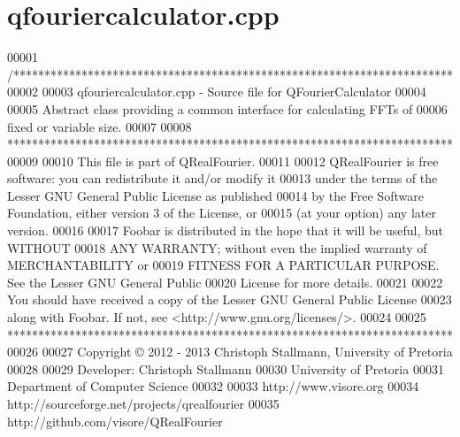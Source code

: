 \hypertarget{a00117_source}{\section{qfouriercalculator.\+cpp}
\label{a00117_source}
}

\begin{DoxyCode}
00001 \textcolor{comment}{/***********************************************************************}
00002 \textcolor{comment}{}
00003 \textcolor{comment}{qfouriercalculator.cpp - Source file for QFourierCalculator}
00004 \textcolor{comment}{}
00005 \textcolor{comment}{Abstract class providing a common interface for calculating FFTs of}
00006 \textcolor{comment}{fixed or variable size.}
00007 \textcolor{comment}{}
00008 \textcolor{comment}{************************************************************************}
00009 \textcolor{comment}{}
00010 \textcolor{comment}{This file is part of QRealFourier.}
00011 \textcolor{comment}{}
00012 \textcolor{comment}{QRealFourier is free software: you can redistribute it and/or modify it}
00013 \textcolor{comment}{under the terms of the Lesser GNU General Public License as published}
00014 \textcolor{comment}{by the Free Software Foundation, either version 3 of the License, or}
00015 \textcolor{comment}{(at your option) any later version.}
00016 \textcolor{comment}{}
00017 \textcolor{comment}{Foobar is distributed in the hope that it will be useful, but WITHOUT}
00018 \textcolor{comment}{ANY WARRANTY; without even the implied warranty of MERCHANTABILITY or}
00019 \textcolor{comment}{FITNESS FOR A PARTICULAR PURPOSE.  See the Lesser GNU General Public}
00020 \textcolor{comment}{License for more details.}
00021 \textcolor{comment}{}
00022 \textcolor{comment}{You should have received a copy of the Lesser GNU General Public License}
00023 \textcolor{comment}{along with Foobar.  If not, see <http://www.gnu.org/licenses/>.}
00024 \textcolor{comment}{}
00025 \textcolor{comment}{************************************************************************}
00026 \textcolor{comment}{}
00027 \textcolor{comment}{Copyright © 2012 - 2013 Christoph Stallmann, University of Pretoria}
00028 \textcolor{comment}{}
00029 \textcolor{comment}{Developer: Christoph Stallmann}
00030 \textcolor{comment}{University of Pretoria}
00031 \textcolor{comment}{Department of Computer Science}
00032 \textcolor{comment}{}
00033 \textcolor{comment}{http://www.visore.org}
00034 \textcolor{comment}{http://sourceforge.net/projects/qrealfourier}
00035 \textcolor{comment}{http://github.com/visore/QRealFourier}

\end{DoxyCode}
